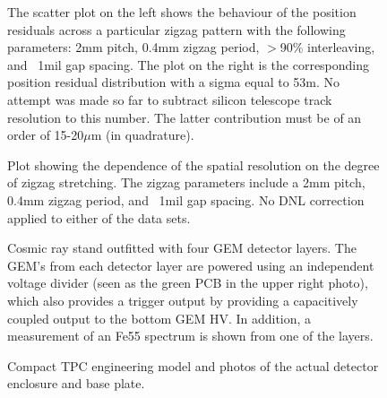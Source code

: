 
\begin{figure}[hbt]
      \centering

      \caption{      \label{fig:Fig5.png}
 The scatter plot on the left shows the behaviour of the position residuals across a particular zigzag pattern with the following parameters: 2mm pitch, 0.4mm zigzag period, $>$90\% interleaving, and ~1mil gap spacing. The plot on the right is the corresponding position residual distribution with a sigma equal to 53m. No attempt was made so far to subtract silicon telescope track resolution to this number. The latter contribution must be of an order of 15-20$\mu$m (in quadrature).}
  \end{figure}
  

\begin{figure}[hbt]
      \centering

      \caption{      \label{fig:Fig6.png}
Plot showing the dependence of the spatial resolution on the degree of zigzag stretching. The zigzag parameters include a 2mm pitch, 0.4mm zigzag period, and ~1mil gap spacing. No DNL correction applied to either of the data sets.}
  \end{figure}
  

\begin{figure}[hbt]
      \centering

      \caption{      \label{fig:Fig7.png}
 Cosmic ray stand outfitted with four GEM detector layers. The GEM’s from each detector layer are powered using an independent voltage divider (seen as the green PCB in the upper right photo), which also provides a trigger output by providing a capacitively coupled output to the bottom GEM HV. In addition, a measurement of an Fe55 spectrum is shown from one of the layers.}
  \end{figure}
  

\begin{figure}[hbt]
      \centering

      \caption{      \label{fig:Fig8.png}
 Compact TPC engineering model and photos of the actual detector enclosure and base plate.}
  \end{figure}
  
